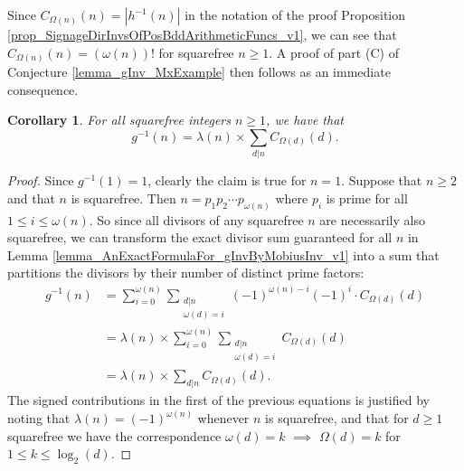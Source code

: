 \documentclass[11pt,reqno,a4letter]{article}
\numberwithin{figure}{section}
\numberwithin{table}{section}
\theoremstyle{plain}
\newtheorem{cor}[theorem]{Corollary}
\numberwithin{theorem}{section}
\theoremstyle{definition}
\begin{document}
Since $C_{\Omega(n)}(n) = |h^{-1}(n)|$ in the notation of the proof 
Proposition \ref{prop_SignageDirInvsOfPosBddArithmeticFuncs_v1}, we can see that 
$C_{\Omega(n)}(n) = (\omega(n))!$ for squarefree $n \geq 1$. 
A proof of part (C) of Conjecture \ref{lemma_gInv_MxExample} then 
follows as an immediate consequence. 

\begin{cor} 
\label{cor_AnExactFormulaFor_gInvByMobiusInv_nSqFree_v2} 
For all squarefree integers $n \geq 1$, we have that 
\begin{equation} 
\label{eqn_gInvnSqFreeN_exactDivSum_Formula} 
g^{-1}(n) = \lambda(n) \times \sum_{d|n} C_{\Omega(d)}(d). 
\end{equation} 
\end{cor} 
\begin{proof} 
Since $g^{-1}(1) = 1$, clearly the claim is true for $n = 1$. Suppose that $n \geq 2$ and that 
$n$ is squarefree. Then $n = p_1p_2 \cdots p_{\omega(n)}$ where $p_i$ is prime for all 
$1 \leq i \leq \omega(n)$. So since all divisors of any squarefree $n$ are necessarily also squarefree, 
we can transform the exact divisor sum guaranteed for all $n$ in 
Lemma \ref{lemma_AnExactFormulaFor_gInvByMobiusInv_v1} into a sum that partitions the divisors by 
their number of distinct prime factors: 
\begin{align*} 
g^{-1}(n) & = \sum_{i=0}^{\omega(n)} \sum_{\substack{d|n \\ \omega(d)=i}} (-1)^{\omega(n) - i} (-1)^{i} \cdot 
     C_{\Omega(d)}(d) \\ 
     & = \lambda(n) \times \sum_{i=0}^{\omega(n)} \sum_{\substack{d|n \\ \omega(d)=i}} C_{\Omega(d)}(d) \\ 
     & = \lambda(n) \times \sum_{d|n} C_{\Omega(d)}(d). 
\end{align*} 
The signed contributions in the first of the previous equations is 
justified by noting that $\lambda(n) = (-1)^{\omega(n)}$ 
whenever $n$ is squarefree, and that for $d \geq 1$
 squarefree we have the correspondence 
 $\omega(d) = k$ $\implies$ $\Omega(d) = k$ for $1 \leq k \leq \log_2(d)$. 
\end{proof} 
\end{document}

